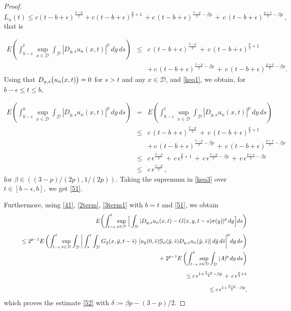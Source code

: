\documentclass[reqno]{amsart}
\numberwithin{equation}{section}
\newcommand{\cd}{\mathcal{D}}
\newcommand{\cg}{\mathcal{G}}
\begin{document}
\begin{proof}
$$L_n(t) \leq c (t-b+\epsilon)^{\frac{3-p}{2}} + c (t-b+\epsilon)^{\frac{p}{2}+1}\,+ c\, (t-b+\epsilon)^{\frac{5-p}{2}-\beta p}
\,+\,
c \, (t-b+\epsilon)^{\frac{p+4}{2}-\beta p} \,,$$
that is

\begin{eqnarray}\label{keq1}
E\left(\int_{b-\epsilon}^t \sup\limits_{x\in\mathcal{D}} \int_{\mathcal{D}}|D_{y,s}u_{n}(x,t)|^p\,dy\, ds\right)
&\leq& c \,(t-b+\epsilon)^{\frac{3-p}{2}} \,+\, c\, (t-b+\epsilon)^{\frac{p}{2}+1}
\nonumber\\
& & + \,c \,(t-b+\epsilon)^{\frac{5-p}{2}-\beta p}\,+\,
c \, (t-b+\epsilon)^{\frac{p+4}{2}-\beta p}.
\end{eqnarray}
Using that $ D_{y,s}\bigl{(}u_n(x,t)\bigr{)}=0 $ for $s>t$ and any $x\in\cd$, and \eqref{keq1}, we obtain, for $ b-\epsilon\leq t\leq b,$

\begin{eqnarray}\label{keq2}
E\left(\int_{b-\epsilon}^b \sup\limits_{x\in\mathcal{D}} \int_{\mathcal{D}}|D_{y,s}u_{n}(x,t)|^p\,dy\,ds\right)
&=&
E\left(\int_{b-\epsilon}^t \sup\limits_{x\in\mathcal{D}} \int_{\mathcal{D}}|D_{y,s}u_{n}(x,t)|^p\,dy\,ds\right)
\nonumber\\
&\leq&
 c \,(t-b+\epsilon)^{\frac{3-p}{2}} \,+\, c\, (t-b+\epsilon)^{\frac{p}{2}+1}
\nonumber\\
& &+\, c\, (t-b+\epsilon)^{\frac{5-p}{2}-\beta p}
\,+\,c \, (t-b+\epsilon)^{\frac{p+4}{2}-\beta p}
\nonumber\\
&\leq&
 c \,\epsilon^{\frac{3-p}{2}} \,+\, c\, \epsilon^{\frac{p}{2}+1}
\,+\, c\, \epsilon^{\frac{5-p}{2}-\beta p}
\,+\,c \, \epsilon^{\frac{p+4}{2}-\beta p}\nonumber\\
&\leq&
 c \,\epsilon^{\frac{3-p}{2}} \,,\label{keq3}
\end{eqnarray}
for $ \beta \in ((3-p)/(2p),1/(2p)). $ Taking the supremum in \eqref{keq3} over $t\in[b-\epsilon,b], $ we get \eqref{51}. 

Furthermore, using \eqref{41}, \eqref{2term}, \eqref{3term1}  with $b=t$ and \eqref{51}, we obtain
\begin{eqnarray*}\label{keq4}
& &E\biggl{(}\int_{t-\epsilon}^t \sup_{x\in\mathcal{D}}
\Big{[}\int_{\mathcal{D}}|D_{y,s}u_n(x,t)-G(x,y,t-s)\sigma(y)|^p\,dy\Big{]}
ds\biggr{)}
\\[0.5em]
& &\qquad\leq  2^{p-1}E\left(\int_{t-\epsilon}^t \sup\limits_{x\in\mathcal{D}} \int_{\mathcal{D}}
\bigg{|}\int_s^t\int_{\cd}G_{\Tilde{y}}(x,\Tilde{y},t-\Tilde{s})\
[u_{\Tilde{y}}(0,\Tilde{s})\cg_{n}(\Tilde{y},\Tilde{s})D_{y,s}u_n(\Tilde{y},\Tilde{s})]\,d\Tilde{y}\,d\Tilde{s}\bigg{|}^p dy\,ds\right)
\\
& &\qquad\qquad+\;2^{p-1} E\left(\int_{t-\epsilon}^t \sup_{x\in\mathcal{D}}\int_{\mathcal{D}}|A|^p\,dy\,ds\right)
\\[0.5em]
& &\qquad \leq 
c\,\epsilon^{1+\frac{3-p}{2}-\beta p} \,+\, c\,\epsilon^{\frac{p}{2}+1}
\\[0.5em]
& &\qquad\leq  c\,\epsilon^{1+\frac{3-p}{2}-\beta p} ,
\end{eqnarray*}
which proves the estimate \eqref{52} with $\delta:=\beta p-(3-p)/2.$
\end{proof}
\end{document}
